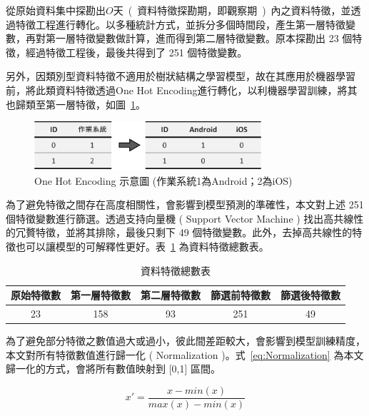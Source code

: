 從原始資料集中探勘出$O$天\ (\ 資料特徵探勘期，即觀察期\ )\ 內之資料特徵，並透過特徵工程進行轉化。以多種統計方式，並拆分多個時間段，產生第一層特徵變數，再對第一層特徵變數做計算，進而得到第二層特徵變數。原本探勘出 23 個特徵，經過特徵工程後，最後共得到了 251 個特徵變數。

另外，因類別型資料特徵不適用於樹狀結構之學習模型，故在其應用於機器學習前，將此類資料特徵透過One Hot Encoding進行轉化，以利機器學習訓練，將其也歸類至第一層特徵，如圖~\ref{fig:eva_OneHotEncoder}。

\begin{figure}[!htb]
    \begin{center}
      \includegraphics[width=0.75\textwidth]{figures/evaluation/Image_OneHotEncoder.png}
      \caption[One Hot Encoding 示意圖]{One Hot Encoding 示意圖 (作業系統1為Android；2為iOS)}
      \label{fig:eva_OneHotEncoder}
    \end{center}
\end{figure}

為了避免特徵之間存在高度相關性，會影響到模型預測的準確性，本文對上述 251 個特徵變數進行篩選。透過支持向量機 ( Support Vector Machine ) 找出高共線性的冗贅特徵，並將其排除，最後只剩下 49 個特徵變數。此外，去掉高共線性的特徵也可以讓模型的可解釋性更好。表~\ref{tab:NumberOfFeatures} 為資料特徵總數表。

\begin{table}[!htb]
	\centering
	\begin{tabular}{ccccc}
	\hline \hline
	原始特徵數 & 第一層特徵數 & 第二層特徵數 & 篩選前特徵數 & 篩選後特徵數 \\
    \hline \hline
    23 & 158 & 93 & 251 & 49 \\
    \hline \hline
	\end{tabular}
	\caption[資料特徵總數表]{資料特徵總數表}
	\label{tab:NumberOfFeatures}
\end{table}

為了避免部分特徵之數值過大或過小，彼此間差距較大，會影響到模型訓練精度，本文對所有特徵數值進行歸一化 ( Normalization )。式~\ref{eq:Normalization} 為本文歸一化的方式，會將所有數值映射到 [0,1] 區間。

\begin{equation}
  \label{eq:Normalization}
  x' = \frac{x-min(x)}{max(x)-min(x)}
\end{equation}
\newpage

